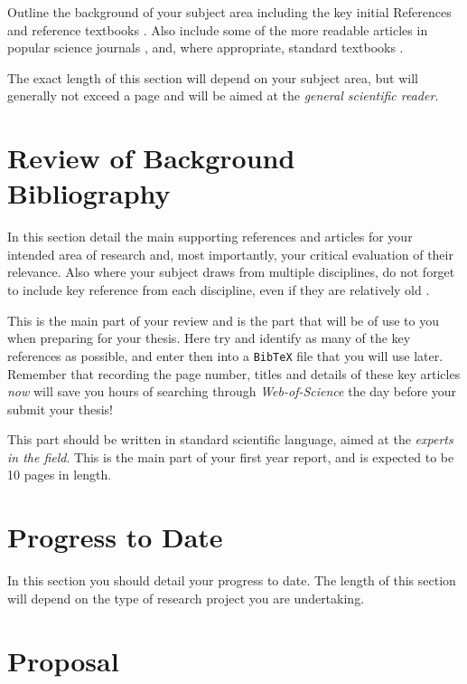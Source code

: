 \documentclass[a4paper,12pt]{article}
\begin{document}
Outline the background of your subject area including the key initial
References \cite{jr:ashkin} and reference textbooks \cite{ob:bornwolf}. 
Also include some of the more
readable articles in popular science journals \cite{jr:dholakia},
and, where appropriate, standard textbooks \cite{ob:hechtoptics}.

The exact length of this section will depend on your subject area,
but will generally not exceed a page and will be aimed at the 
{\it general scientific reader}. 

\section{Review of Background Bibliography}

In this section detail the main supporting references
and articles \cite{jr:block} for your intended area of research
and, most importantly, your critical evaluation of their
relevance.  Also where your subject draws from multiple 
disciplines, do not forget to include key reference from
each discipline, even if they are relatively old \cite{jr:dammann}. 


This is the main part of your review and is the part that
will be of use to you when preparing for your thesis. Here try
and identify as many of the key references as possible, and enter then
into a {\tt BibTeX} file that you will use later. Remember that recording
the page number, titles and details of these 
key articles {\it now} will save you hours of
searching through {\em Web-of-Science} the day before your
submit your thesis!

This part should be written in standard scientific language, 
aimed at the {\em experts in the field}. This is the main part of your first year report, and is 
expected to be 10 pages in length.

\section{Progress to Date}

In this section you should detail your progress to date. The length of this section
will depend on the type of research project you are undertaking.  

\section{Proposal}
\end{document}
